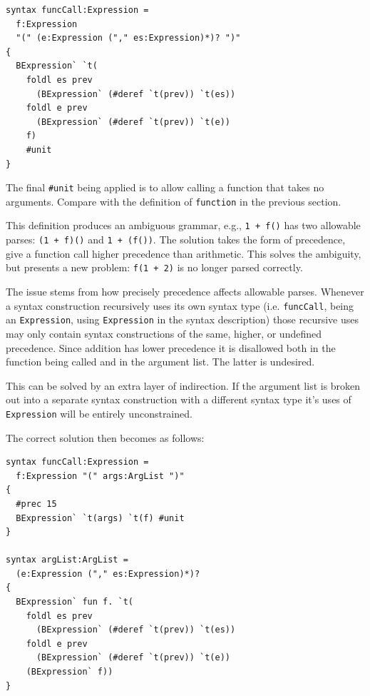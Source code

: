 \documentclass{kththesis}
\begin{document}
\begin{verbatim}
syntax funcCall:Expression =
  f:Expression
  "(" (e:Expression ("," es:Expression)*)? ")"
{
  BExpression` `t(
    foldl es prev
      (BExpression` (#deref `t(prev)) `t(es))
    foldl e prev
      (BExpression` (#deref `t(prev)) `t(e))
    f)
    #unit
}
\end{verbatim}

The final \texttt{#unit} being applied is to allow calling a function that takes no arguments. Compare with the definition of \texttt{function} in the previous section. %

This definition produces an ambiguous grammar, e.g., \texttt{1 + f()} has two allowable parses: \texttt{(1 + f)()} and \texttt{1 + (f())}. The solution takes the form of precedence, give a function call higher precedence than arithmetic. This solves the ambiguity, but presents a new problem: \texttt{f(1 + 2)} is no longer parsed correctly.

The issue stems from how precisely precedence affects allowable parses. Whenever a syntax construction recursively uses its own syntax type (i.e. \texttt{funcCall}, being an \texttt{Expression}, using \texttt{Expression} in the syntax description) those recursive uses may only contain syntax constructions of the same, higher, or undefined precedence. Since addition has lower precedence it is disallowed both in the function being called and in the argument list. The latter is undesired.

This can be solved by an extra layer of indirection. If the argument list is broken out into a separate syntax construction with a different syntax type it's uses of \texttt{Expression} will be entirely unconstrained.

The correct solution then becomes as follows:

\begin{verbatim}
syntax funcCall:Expression =
  f:Expression "(" args:ArgList ")"
{
  #prec 15
  BExpression` `t(args) `t(f) #unit
}

syntax argList:ArgList =
  (e:Expression ("," es:Expression)*)?
{
  BExpression` fun f. `t(
    foldl es prev
      (BExpression` (#deref `t(prev)) `t(es))
    foldl e prev
      (BExpression` (#deref `t(prev)) `t(e))
    (BExpression` f))
}
\end{verbatim}
\end{document}
